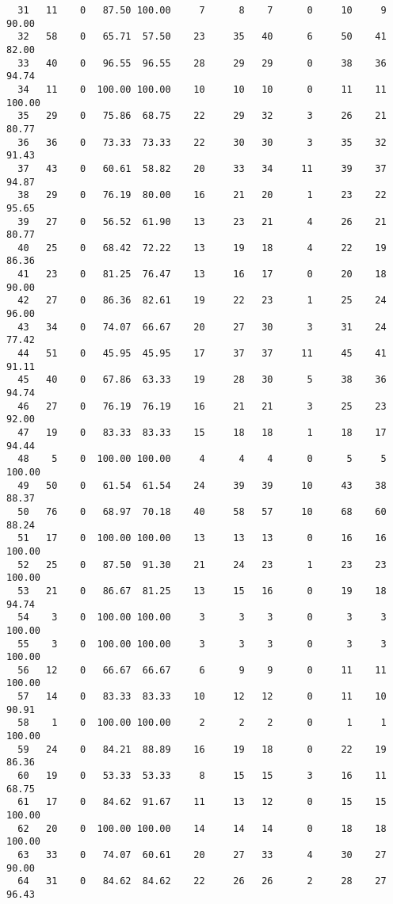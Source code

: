 \begin{verbatim}
  31   11    0   87.50 100.00     7      8    7      0     10     9    90.00
  32   58    0   65.71  57.50    23     35   40      6     50    41    82.00
  33   40    0   96.55  96.55    28     29   29      0     38    36    94.74
  34   11    0  100.00 100.00    10     10   10      0     11    11   100.00
  35   29    0   75.86  68.75    22     29   32      3     26    21    80.77
  36   36    0   73.33  73.33    22     30   30      3     35    32    91.43
  37   43    0   60.61  58.82    20     33   34     11     39    37    94.87
  38   29    0   76.19  80.00    16     21   20      1     23    22    95.65
  39   27    0   56.52  61.90    13     23   21      4     26    21    80.77
  40   25    0   68.42  72.22    13     19   18      4     22    19    86.36
  41   23    0   81.25  76.47    13     16   17      0     20    18    90.00
  42   27    0   86.36  82.61    19     22   23      1     25    24    96.00
  43   34    0   74.07  66.67    20     27   30      3     31    24    77.42
  44   51    0   45.95  45.95    17     37   37     11     45    41    91.11
  45   40    0   67.86  63.33    19     28   30      5     38    36    94.74
  46   27    0   76.19  76.19    16     21   21      3     25    23    92.00
  47   19    0   83.33  83.33    15     18   18      1     18    17    94.44
  48    5    0  100.00 100.00     4      4    4      0      5     5   100.00
  49   50    0   61.54  61.54    24     39   39     10     43    38    88.37
  50   76    0   68.97  70.18    40     58   57     10     68    60    88.24
  51   17    0  100.00 100.00    13     13   13      0     16    16   100.00
  52   25    0   87.50  91.30    21     24   23      1     23    23   100.00
  53   21    0   86.67  81.25    13     15   16      0     19    18    94.74
  54    3    0  100.00 100.00     3      3    3      0      3     3   100.00
  55    3    0  100.00 100.00     3      3    3      0      3     3   100.00
  56   12    0   66.67  66.67     6      9    9      0     11    11   100.00
  57   14    0   83.33  83.33    10     12   12      0     11    10    90.91
  58    1    0  100.00 100.00     2      2    2      0      1     1   100.00
  59   24    0   84.21  88.89    16     19   18      0     22    19    86.36
  60   19    0   53.33  53.33     8     15   15      3     16    11    68.75
  61   17    0   84.62  91.67    11     13   12      0     15    15   100.00
  62   20    0  100.00 100.00    14     14   14      0     18    18   100.00
  63   33    0   74.07  60.61    20     27   33      4     30    27    90.00
  64   31    0   84.62  84.62    22     26   26      2     28    27    96.43

\end{verbatim}
